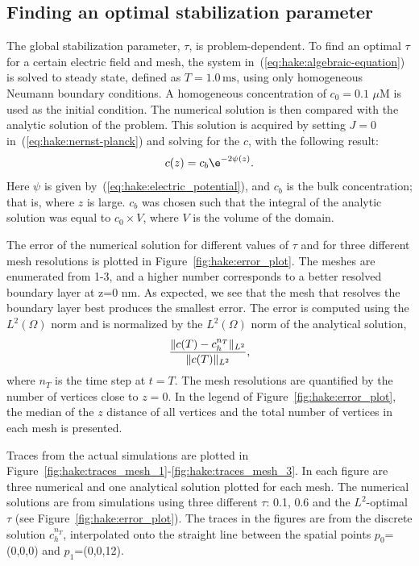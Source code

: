 \subsection{Finding an optimal stabilization parameter}
The global stabilization parameter, $\tau$, is problem-dependent. To
find an optimal $\tau$ for a certain electric field and mesh, the
system in~(\ref{eq:hake:algebraic-equation}) is solved to steady
state, defined as $T = 1.0\,\mathrm{ms}$, using only homogeneous
Neumann boundary conditions. A homogeneous concentration of $c_0=0.1$
$\mu$M is used as the initial condition. The numerical solution is
then compared with the analytic solution of the problem. This solution
is acquired by setting $J=0$ in~(\ref{eq:hake:nernst-planck}) and
solving for the $c$, with the following result:
\begin{equation}
  \label{eq:hake:analytic-solution}
  c(z) = c_b\e^{-2\psi(z)}.
\end{equation}
Here $\psi$ is given by~(\ref{eq:hake:electric_potential}), and
$c_b$ is the bulk concentration; that is, where $z$ is large. $c_b$ was
chosen such that the integral of the analytic solution was equal to
$c_0\times V$, where $V$ is the volume of the domain.

The error of the numerical solution for different values of $\tau$ and
for three different mesh resolutions is plotted in
Figure~\ref{fig:hake:error_plot}. The meshes are enumerated from 1-3,
and a higher number corresponds to a better resolved boundary layer at
z=0 nm. As expected, we see that the mesh that resolves the boundary
layer best produces the smallest error. The error is computed using
the $L^2(\Omega)$ norm and is normalized by the $L^2(\Omega)$ norm of
the analytical solution,
\begin{equation}
  \label{eq:hake:error_norm}
  \frac{\|c(T)-c_h^{n_T}\|_{L^2}}{\|c(T)\|_{L^2}},
\end{equation}
where $n_T$ is the time step at $t=T$. The mesh resolutions are
quantified by the number of vertices close to $z=0$. In the legend of
Figure~\ref{fig:hake:error_plot}, the median of the $z$ distance of all
vertices and the total number of vertices in each mesh is presented.

Traces from the actual simulations are plotted in
Figure~\ref{fig:hake:traces_mesh_1}-\ref{fig:hake:traces_mesh_3}. In
each figure are three numerical and one analytical solution plotted
for each mesh. The numerical solutions are from simulations using
three different $\tau$: 0.1, 0.6 and the $L^2$-optimal $\tau$ (see
Figure~\ref{fig:hake:error_plot}). The traces in the figures are from
the discrete solution $c_h^{n_T}$, interpolated onto the straight line
between the spatial points $p_0$=(0,0,0) and $p_1$=(0,0,12).

